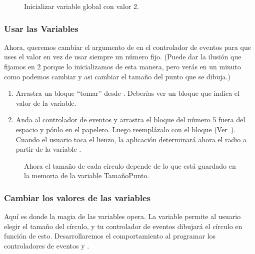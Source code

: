 \begin{figure}[H]
\centering
\caption{Inicializar variable global  con valor
  2.}
\label{fig:PaintPot15}
\end{figure}

\subsubsection*{Usar las Variables}

Ahora, queremos cambiar el argumento de
 en el controlador de eventos
 para que uses el valor
 en vez de usar siempre un número fijo. (Puede
dar la ilusión que fijamos  en 2 porque lo
inicializamos de esta manera, pero verás en un minuto como podemos
cambiar  y asi cambiar el tamaño del punto que
se dibuja.)

\begin{enumerate}
\item Arrastra un bloque ``tomar'' desde
  . Deberías ver un bloque
   que indica el valor de la variable.

\item Anda al controlador de eventos  y
  arrastra el bloque del número 5 fuera del espacio  y
  pónlo en el papelero.  Luego reemplázalo con el bloque  (Ver~). Cuando el usuario
  toca el lienzo, la aplicación determinará ahora el radio a partir de
  la variable .
\end{enumerate}

\begin{figure}[H]
\centering
\caption{Ahora el tamaño de cada círculo depende de lo
que está guardado en la memoria de la variable TamañoPunto.}
\label{fig:PaintPot16}
\end{figure}

\subsubsection*{Cambiar los valores de las variables}

Aquí es donde la magia de las variables opera. La variable
 permite al usuario elegir el tamaño del
círculo, y tu controlador de eventos dibujará el círculo en función de
esto.  Desarrollaremos el comportamiento al programar los
controladores de eventos  y
.

